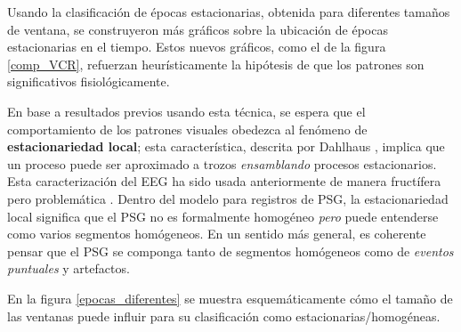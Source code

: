 Usando la clasificación de épocas estacionarias, obtenida para diferentes tamaños de ventana,
se construyeron más gráficos sobre la ubicación de épocas estacionarias en el tiempo. Estos
nuevos
gráficos, como el de la figura \ref{comp_VCR}, refuerzan heurísticamente la hipótesis de que los 
patrones son significativos fisiológicamente. 

En base a resultados previos usando esta técnica, se espera que el comportamiento de los
patrones visuales obedezca al fenómeno de \textbf{estacionariedad local}; esta característica,
descrita por Dahlhaus \cite{Dahlhaus97}, implica que un proceso puede ser aproximado a trozos
\textit{ensamblando} procesos estacionarios.
%
Esta caracterización del EEG ha sido usada anteriormente de manera fructífera pero problemática
\cite{Barlow85,Kaplan99}.
%
Dentro del modelo para registros de PSG, la estacionariedad local significa que el PSG no es
formalmente homogéneo \textit{pero} puede entenderse como varios segmentos homógeneos. En un
sentido más general, es coherente pensar que el PSG se componga tanto de segmentos homógeneos
como de \textit{eventos puntuales} y artefactos.

En la figura \ref{epocas_diferentes} se muestra esquemáticamente cómo el tamaño
de las ventanas puede influir para su clasificación como estacionarias/homogéneas.

%

%



